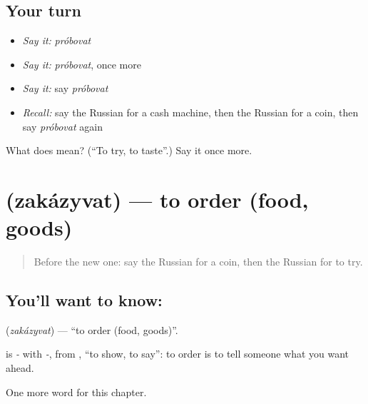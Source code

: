 \subsection*{Your turn}
\begin{itemize}
\raggedright
  \item \emph{Say it:} \emph{próbovat}
  \item \emph{Say it:} \emph{próbovat}, once more
  \item \emph{Say it:} say \emph{próbovat}
  \item \emph{Recall:} say the Russian for a cash machine, then the Russian for a coin, then say \emph{próbovat} again
\end{itemize}

\begin{tcolorbox}[breakable,colback=teal!4,colframe=teal!35!black,title={Before you move on}]
What does  mean? (\textquotedblleft{}To try, to taste\textquotedblright{}.) Say it once more.
\end{tcolorbox}
\section[\texorpdfstring{\ru{заказывать} (zakázyvat)}{заказывать (zakázyvat)}]{ (zakázyvat) — to order (food, goods)}

\label{lesson:RU-C204-zakazyvat}



\begin{quote}
Before the new one: say the Russian for a coin, then the Russian for to try.
\end{quote}

\subsection*{You'll want to know: }
\textbf{} (\emph{zakázyvat}) — \textquotedblleft{}to order (food, goods)\textquotedblright{}.

\begin{cousinweb}
\textbf{} is \emph{-} with \emph{-}, from \emph{}, \textquotedblleft{}to show, to say\textquotedblright{}: to order is to tell someone what you want ahead.
\end{cousinweb}

\begin{grammarlens}[title={What you've built}]
One more word for this chapter.
\end{grammarlens}

